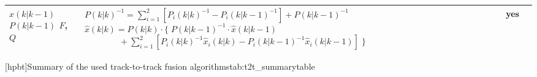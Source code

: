 \begin{center}
{\begin{tabular}{lL{2.5cm}L{10.5cm}c}
			$ \hat{x}(k|k-1) $	\newline
			$ P(k|k-1)$			\newline
			$F$, $Q$
		&	
		\newline 
		$ P(k|k)^{-1} = \sum_{i=1}^2 \left[ P_i(k|k)^{-1}  - P_i(k|k-1)^{-1} \right]  + P(k|k-1)^{-1} $	\newline \vspace{5pt}
		$ \hat{x}(k|k) = P(k|k) \cdot \{ \; P(k|k-1)^{-1} \cdot \hat{x}(k|k-1)  $	\newline \vspace{5pt}
		$	 \qquad	\qquad		 + \sum_{i=1}^2 \left[ P_i(k|k)^{-1} \hat{x}_i(k|k) - P_i(k|k-1)^{-1} \hat{x}_i(k|k-1) \right] \; \}	$
		&	yes		\\
	\bottomrule
    \end{tabular}
}[hpbt]{Summary of the used track-to-track fusion algorithms}{tab:t2t_summarytable}
\end{center}
\vfill\clearpage

